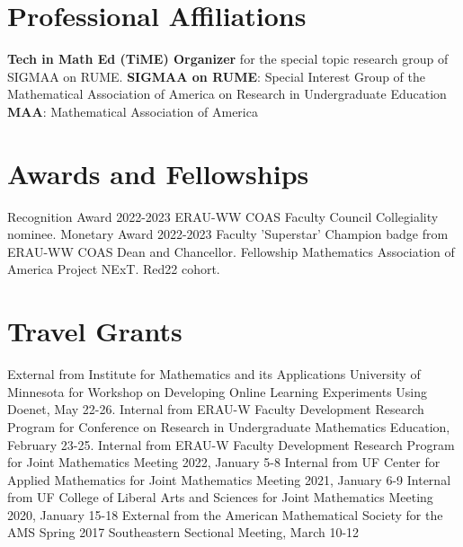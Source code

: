 \documentclass[10pt,a4paper,sans]{moderncv}
\begin{document}
\section{Professional Affiliations}
		{\textbf{Tech in Math Ed (TiME) Organizer} for the special topic research group of SIGMAA on RUME.}
		{\textbf{SIGMAA on RUME}: Special Interest Group of the Mathematical Association of America on Research in Undergraduate Education}
		{\textbf{MAA}: Mathematical Association of America} 

\section{Awards and Fellowships}
		{Recognition Award}
		{}
		{2022-2023 ERAU-WW COAS Faculty Council Collegiality nominee.}
		{}{}
		{Monetary Award}
		{}
		{2022-2023 Faculty 'Superstar' Champion badge from ERAU-WW COAS Dean and Chancellor.}
		{}{}
		{Fellowship}
		{}
		{Mathematics Association of America Project NExT. Red22 cohort.}
	{}{}
\section{Travel Grants}
		{External}
		{}
		{from Institute for Mathematics and its Applications University of Minnesota for Workshop on Developing Online Learning Experiments Using Doenet, May 22-26.}
		{}{}
		{Internal}
		{}
		{from ERAU-W Faculty Development Research Program for Conference on Research in Undergraduate Mathematics Education, February 23-25.}
		{}{}
		{Internal}
		{}
		{from ERAU-W Faculty Development Research Program for Joint Mathematics Meeting 2022, January 5-8}
		{}{}
		{Internal}
		{}
		{from UF Center for Applied Mathematics for Joint Mathematics Meeting 2021, January 6-9}
		{}{}
		{Internal}
		{}
		{from UF College of Liberal Arts and Sciences for Joint Mathematics Meeting 2020, January 15-18}
		{}{}
		{External}
		{}
		{from the American Mathematical Society for the AMS Spring 2017 Southeastern Sectional Meeting, March 10-12}
		{}{}

\end{document}
